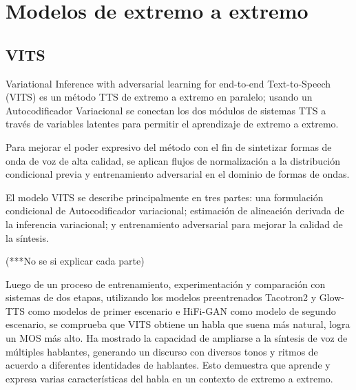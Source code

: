 \section{Modelos de extremo a extremo}
\subsection{VITS}

Variational Inference with adversarial learning for end-to-end Text-to-Speech (VITS) es un método TTS de extremo a extremo en paralelo; usando un Autocodificador Variacional se conectan los dos módulos de sistemas TTS a través de variables latentes para permitir el aprendizaje de extremo a extremo. 

Para mejorar el poder expresivo del método con el fin de sintetizar formas de onda de voz de alta calidad, se aplican flujos de normalización a la distribución condicional previa y entrenamiento adversarial en el dominio de formas de ondas.

El modelo VITS se describe principalmente en tres partes: una formulación condicional de Autocodificador variacional; estimación de alineación derivada de la inferencia variacional; y entrenamiento adversarial para mejorar la calidad de la síntesis.

(***No se si explicar cada parte)

Luego de un proceso de entrenamiento, experimentación y comparación con sistemas de dos etapas, utilizando los modelos preentrenados Tacotron2 y Glow-TTS como modelos de primer escenario e HiFi-GAN como modelo de segundo escenario, se comprueba que VITS obtiene un habla que suena más natural, logra un MOS más alto. Ha mostrado la capacidad de ampliarse a la síntesis de voz de múltiples hablantes, generando un discurso con diversos tonos y ritmos de acuerdo a diferentes identidades de hablantes. Esto demuestra que aprende y expresa varias características del habla en un contexto de extremo a extremo.